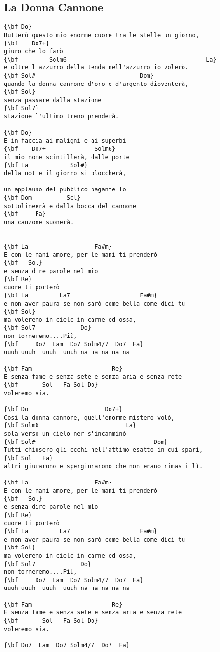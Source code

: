 \documentclass[a4paper]{article}
\begin{document}
\subsection{La Donna Cannone}
\begin{Verbatim}[commandchars=\\\{\}]
{\bf Do}
Butterò questo mio enorme cuore tra le stelle un giorno,
{\bf    Do7+}
giuro che lo farò
{\bf         Solm6                                        La}
e oltre l'azzurro della tenda nell'azzurro io volerò.
{\bf Sol#                              Dom}
quando la donna cannone d'oro e d'argento dioventerà,
{\bf Sol}
senza passare dalla stazione
{\bf Sol7}
stazione l'ultimo treno prenderà.

{\bf Do}
E in faccia ai maligni e ai superbi
{\bf    Do7+              Solm6}
il mio nome scintillerà, dalle porte
{\bf La            Sol#}
della notte il giorno si bloccherà,

un applauso del pubblico pagante lo
{\bf Dom          Sol}
sottolineerà e dalla bocca del cannone
{\bf     Fa}
una canzone suonerà.


{\bf La                   Fa#m}
E con le mani amore, per le mani ti prenderò
{\bf   Sol}
e senza dire parole nel mio
{\bf Re}
cuore ti porterò
{\bf La         La7                    Fa#m}
e non aver paura se non sarò come bella come dici tu
{\bf Sol}
ma voleremo in cielo in carne ed ossa,
{\bf Sol7             Do}
non torneremo....Più,
{\bf     Do7  Lam  Do7 Solm4/7  Do7  Fa}
uuuh uuuh  uuuh  uuuh na na na na na

{\bf Fam                       Re}
E senza fame e senza sete e senza aria e senza rete
{\bf       Sol   Fa Sol Do}
voleremo via. 

{\bf Do                      Do7+}
Così la donna cannone, quell'enorme mistero volò,
{\bf Solm6                         La}
sola verso un cielo ner s'incamminò
{\bf Sol#                                  Dom}
Tutti chiusero gli occhi nell'attimo esatto in cui sparì,
{\bf Sol   Fa}
altri giurarono e spergiurarono che non erano rimasti lì.

{\bf La                   Fa#m}
E con le mani amore, per le mani ti prenderò
{\bf   Sol}
e senza dire parole nel mio
{\bf Re}
cuore ti porterò
{\bf La         La7                    Fa#m}
e non aver paura se non sarò come bella come dici tu
{\bf Sol}
ma voleremo in cielo in carne ed ossa,
{\bf Sol7             Do}
non torneremo....Più,
{\bf     Do7  Lam  Do7 Solm4/7  Do7  Fa}
uuuh uuuh  uuuh  uuuh na na na na na

{\bf Fam                       Re}
E senza fame e senza sete e senza aria e senza rete
{\bf       Sol   Fa Sol Do}
voleremo via. 

{\bf Do7  Lam  Do7 Solm4/7  Do7  Fa}

\end{Verbatim}
\newpage
\end{document}
